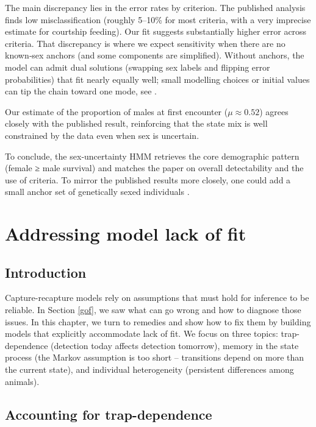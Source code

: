 \documentclass[
  12pt,
]{krantz}
\begin{document}
The main discrepancy lies in the error rates by criterion. The published analysis finds low misclassification (roughly 5--10\% for most criteria, with a very imprecise estimate for courtship feeding). Our fit suggests substantially higher error across criteria. That discrepancy is where we expect sensitivity when there are no known‐sex anchors (and some components are simplified). Without anchors, the model can admit dual solutions (swapping sex labels and flipping error probabilities) that fit nearly equally well; small modelling choices or initial values can tip the chain toward one mode, see \citet{pradel2008sex}.

Our estimate of the proportion of males at first encounter (\(\mu \approx 0.52\)) agrees closely with the published result, reinforcing that the state mix is well constrained by the data even when sex is uncertain.

To conclude, the sex‐uncertainty HMM retrieves the core demographic pattern (female ≥ male survival) and matches the paper on overall detectability and the use of criteria. To mirror the published results more closely, one could add a small anchor set of genetically sexed individuals \citep[an information used in][ but that I did not have]{pradel2008sex}.

\chapter{Addressing model lack of fit}\label{lackoffit}

\section{Introduction}\label{introduction-9}

Capture-recapture models rely on assumptions that must hold for inference to be reliable. In Section \ref{gof}, we saw what can go wrong and how to diagnose those issues. In this chapter, we turn to remedies and show how to fix them by building models that explicitly accommodate lack of fit. We focus on three topics: trap-dependence (detection today affects detection tomorrow), memory in the state process (the Markov assumption is too short -- transitions depend on more than the current state), and individual heterogeneity (persistent differences among animals).

\section{Accounting for trap-dependence}\label{trapdep}
\end{document}
